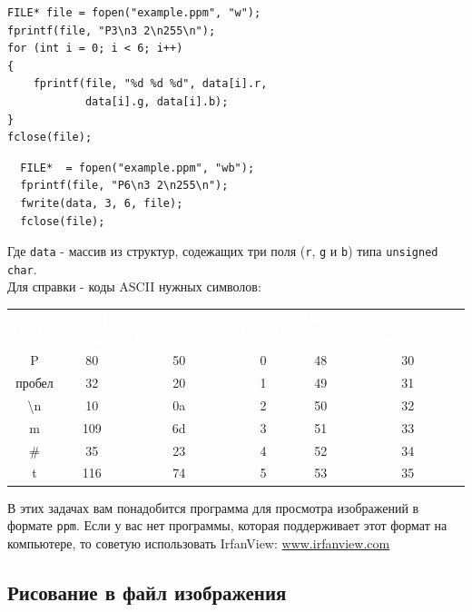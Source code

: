 \documentclass{article}
\begin{document}
\begin{multicols}{2}
\noindent
\begin{lstlisting}
FILE* file = fopen("example.ppm", "w");
fprintf(file, "P3\n3 2\n255\n");
for (int i = 0; i < 6; i++) 
{
    fprintf(file, "%d %d %d", data[i].r, 
            data[i].g, data[i].b);
}
fclose(file);
\end{lstlisting}
\vfill\null
\columnbreak
\begin{lstlisting}
  FILE*  = fopen("example.ppm", "wb");
  fprintf(file, "P6\n3 2\n255\n");
  fwrite(data, 3, 6, file);
  fclose(file);
\end{lstlisting}
\vfill\null
\end{multicols}
Где \texttt{data} - массив из структур, содежащих три поля (\texttt{r}, \texttt{g} и \texttt{b}) типа \texttt{unsigned char}.\\
Для справки - коды ASCII нужных символов:\\
\begin{tabular}{ccc | ccc} 
\rowcolor[rgb]{0,0.173,0.3255}
\textcolor{white}{Символ}\quad&\textcolor{white}{ASCII-код}\quad&\textcolor{white}{ASCII-код в 16-ричной системе}&
\textcolor{white}{Символ}\quad&\textcolor{white}{ASCII-код}\quad&\textcolor{white}{ASCII-код в 16-ричной системе}
\\ 
\rowcolor[rgb]{0.89451,0.93588,0.97078} 
P                & 80 & 50       &         0  & 48 & 30 \\
пробел           & 32 & 20       &         1  & 49 & 31  \\
\textbackslash n & 10 & 0a       &         2  & 50 & 32  \\
m                & 109& 6d       &         3  & 51 & 33  \\
\#               & 35 & 23       &         4  & 52 & 34  \\
t                & 116 & 74      &         5  & 53 & 35 
\end{tabular}
\newpage

В этих задачах вам понадобится программа для просмотра изображений в формате \texttt{ppm}. Если у вас нет программы, которая поддерживает этот  формат на компьютере, то советую использовать IrfanView: \href{https://www.irfanview.com/}{www.irfanview.com}
\subsection*{Рисование в файл изображения}
\end{document}
